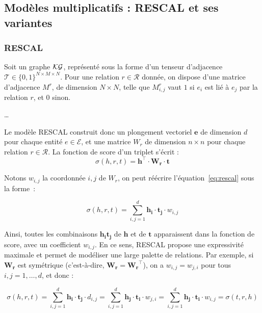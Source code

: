 \subsection{Modèles multiplicatifs : RESCAL et ses variantes}
\label{subsec:kge-models-mult}

\subsubsection{RESCAL}
Soit un graphe $\mathcal{KG}$, représenté sous la forme d'un tenseur d'adjacence $\mathcal{T} \in \{0, 1\}^{N \times M \times N}$. Pour une relation $r \in \mathcal{R}$ donnée, on dispose d'une matrice d'adjacence $M^r$, de dimension $N \times N$, telle que $M_{i, j}^r$ vaut $1$ si $e_i$ est lié à $e_j$ par la relation $r$, et $0$ sinon.

\ldots

Le modèle RESCAL \cite{nickel2011learning} construit donc un plongement vectoriel $\mathbf{e}$ de dimension $d$ pour chaque entité $e \in \mathcal{E}$, et une matrice $W_r$ de dimension $n \times n$ pour chaque relation $r \in \mathcal{R}$. La fonction de score d'un triplet s'écrit :
\begin{equation}
    \sigma(h, r, t) = \mathbf{h^\top \cdot W_r \cdot t}
    \label{eq:rescal}
\end{equation}

Notons $w_{i, j}$ la coordonnée $i,j$ de $W_r$, on peut réécrire l'équation~\ref{eq:rescal} sous la forme~:

\begin{equation}
    \sigma(h, r, t) = \sum_{i, j = 1}^{d} \mathbf{h_i \cdot t_j} \cdot w_{i, j}
\end{equation}

Ainsi, toutes les combinaisons $\mathbf{h_i t_j}$ de $\mathbf{h}$ et de $\mathbf{t}$ apparaissent dans la fonction de score, avec un coefficient $w_{i, j}$. En ce sens, RESCAL propose une expressivité maximale et permet de modéliser une large palette de relations. Par exemple, si $\mathbf{W_r}$ est symétrique (c'est-à-dire, $\mathbf{W_r} = \mathbf{W_r}^\top$), on a $w_{i,j} = w_{j, i}$ pour tous $i, j = 1, \ldots, d$, et donc :

\begin{equation}
    \sigma(h, r, t) = \sum_{i, j = 1}^{d} \mathbf{h_i \cdot t_j} \cdot d_{i, j}
    =  \sum_{i, j = 1}^{d} \mathbf{h_j \cdot t_i} \cdot w_{j, i}
    =  \sum_{i, j = 1}^{d} \mathbf{h_j \cdot t_i} \cdot w_{i, j}
    = \sigma(t, r, h)
\end{equation}

